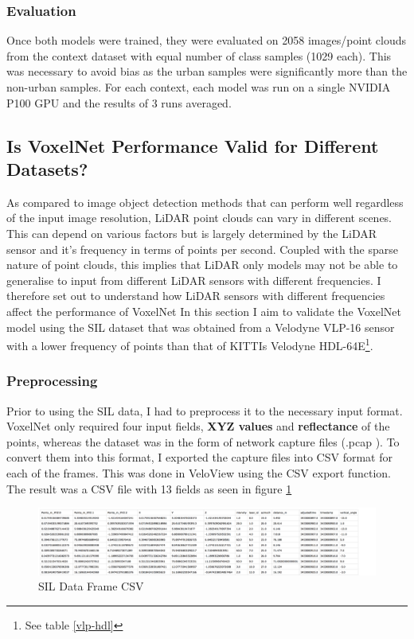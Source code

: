 \subsubsection*{Evaluation} 

Once both models were trained, they were evaluated on 2058 images/point clouds from the context dataset with equal number of class samples (1029 each). This was necessary to avoid bias as the urban samples were significantly more than the non-urban samples. For each context, each model was run on a single NVIDIA P100 GPU and the results of 3 runs  averaged. 



\subsection{Is VoxelNet Performance Valid for Different Datasets?}
As compared to image object detection methods that can perform well regardless of  the input image resolution, LiDAR point clouds can vary in different scenes. This can depend on various factors but is largely determined by the LiDAR sensor and it's frequency in terms of points per second. Coupled with the sparse nature of point clouds, this implies that LiDAR only models may not be able to generalise to input from different LiDAR sensors with different frequencies. I  therefore set out to understand how LiDAR sensors with different frequencies affect the performance of VoxelNet
In this section I aim to validate the VoxelNet model using the SIL dataset that was obtained from a Velodyne VLP-16 sensor with a lower frequency of points than that of KITTIs Velodyne HDL-64E\footnote{See table \ref{vlp-hdl}}.
\subsubsection*{Preprocessing}
Prior to using the SIL data, I had to preprocess it to the necessary input format. 
VoxelNet only required four input fields, \textbf{XYZ values} and \textbf{reflectance} of the points, whereas the dataset was in the form of network capture files (.pcap ). To convert them into this format, I exported the capture files into CSV format for each of the frames. This was done  in VeloView using the CSV export function. The result was a CSV file with 13 fields as seen in figure \ref{fig:sildata}

\begin{figure}[h]
	\includegraphics[width=\linewidth]{images/sildata.png}
	\caption{SIL Data Frame CSV}
	\label{fig:sildata}
\end{figure}

